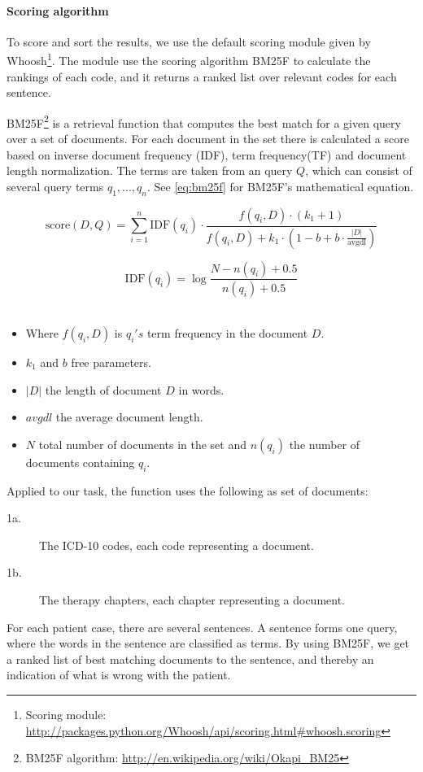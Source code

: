 \paragraph{Scoring algorithm}
To score and sort the results, we use the default scoring module given by Whoosh\footnote{Scoring module: \url{http://packages.python.org/Whoosh/api/scoring.html\#whoosh.scoring}}. The module use the scoring algorithm BM25F to calculate the rankings of each code, and it returns a ranked list over relevant codes for each sentence.

BM25F\footnote{BM25F algorithm: \url{http://en.wikipedia.org/wiki/Okapi_BM25}} is a retrieval function that computes the best match for a given query over a set of documents.  For each document in the set there is calculated a score based on inverse document frequency (IDF), term frequency(TF) and document length normalization. The terms are taken from an query \(Q\), which can consist of several query terms \(q_{1}, ... , q_{n}\). See \autoref{eq:bm25f} for BM25F's mathematical equation.

\begin{equation} \label{eq:bm25f}
	\text{score}(D,Q) = \sum_{i=1}^{n} \text{IDF}(q_i) \cdot \frac{f(q_i, D) \cdot (k_1 + 1)}{f(q_i, D) + k_1 \cdot (1 - b + b \cdot \frac{|D|}{\text{avgdl}})}
\end{equation}

\begin{equation} \label{eq:idf}
	\text{IDF}(q_i) = \log \frac{N - n(q_i) + 0.5}{n(q_i) + 0.5}
\end{equation}\\
\begin{itemize}
\item Where \( f(q_i, D) \)  is \(q_{i}'s\) term frequency in the document \(D\).
\item \(k_{1}\) and \(b\) free parameters.
\item \(|D|\) the length of document \(D\) in words.
\item \(avgdl\) the average document length.
\item \(N\) total number of documents in the set and \(n(q_{i})\) the number of documents containing \(q_{i}\).
\end{itemize}
Applied to our task, the function uses the following as set of documents:
\begin{description}
\item[1a.] The ICD-10 codes, each code representing a document.
\item[1b.] The therapy chapters, each chapter representing a document. 
\end{description}
 For each patient case, there are several sentences. A sentence forms one query, where the words in the sentence are classified as terms. By using BM25F, we get a ranked list of best matching documents to the sentence, and thereby an indication of what is wrong with the patient. 


